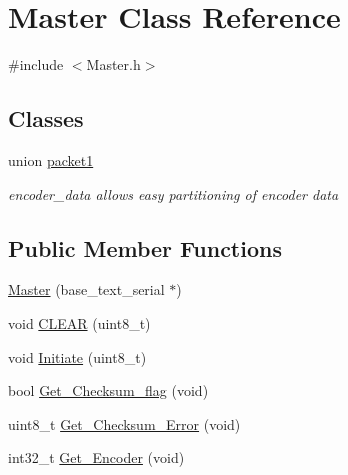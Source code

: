 \hypertarget{classMaster}{\section{Master Class Reference}
\label{classMaster}
}


{\ttfamily \#include $<$Master.\-h$>$}

\subsection*{Classes}
\begin{DoxyCompactItemize}
\item 
union \hyperlink{unionMaster_1_1packet1}{packet1}
\begin{DoxyCompactList}\small\item\em encoder\-\_\-data allows easy partitioning of encoder data \end{DoxyCompactList}\end{DoxyCompactItemize}
\subsection*{Public Member Functions}
\begin{DoxyCompactItemize}
\item 
\hyperlink{classMaster_a39589d526331f8b5abf9d405a5ea7fe7}{Master} (base\-\_\-text\-\_\-serial $\ast$)
\item 
void \hyperlink{classMaster_ad85c13cad19e5600c6d2dff28aaa0a52}{C\-L\-E\-A\-R} (uint8\-\_\-t)
\item 
void \hyperlink{classMaster_af507aba60a24105be4b58a441780fa28}{Initiate} (uint8\-\_\-t)
\item 
bool \hyperlink{classMaster_af5baf3043c5c903472a906cd29643725}{Get\-\_\-\-Checksum\-\_\-flag} (void)
\item 
uint8\-\_\-t \hyperlink{classMaster_ac93f188774888e736f1bcb3345e6f208}{Get\-\_\-\-Checksum\-\_\-\-Error} (void)
\item 
int32\-\_\-t \hyperlink{classMaster_ac6036259c4c2c8f4f3a11fd36ae23a6b}{Get\-\_\-\-Encoder} (void)
\end{DoxyCompactItemize}
